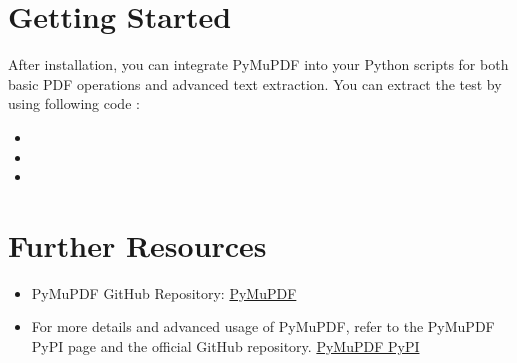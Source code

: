 \section{Getting Started}

After installation, you can integrate PyMuPDF into your Python scripts for both basic PDF operations and advanced text extraction. You can extract the test by using following code \cite{pymupdf:2024d}:%

\begin{itemize}
\item[] 
\item[] 
\item[] 
\end{itemize}


\section{Further Resources}

\begin{itemize}
    \item PyMuPDF GitHub Repository: \href{https://github.com/pymupdf/PyMuPDF}{PyMuPDF}
    \item For more details and advanced usage of PyMuPDF, refer to the PyMuPDF PyPI page and the official GitHub repository. \href{https://pymupdf.readthedocs.io/en/latest/}{PyMuPDF PyPI}
\end{itemize}
